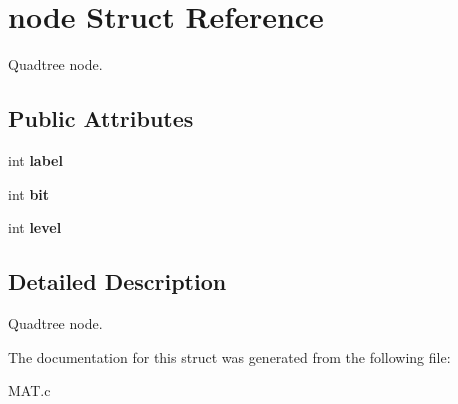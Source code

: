 \hypertarget{structnode}{}\section{node Struct Reference}
\label{structnode}


Quadtree node.  


\subsection*{Public Attributes}
\begin{DoxyCompactItemize}
\item 
\mbox{\label{structnode_a964cbb51357a791bf72d51d353e86be7}} 
int {\bfseries label}
\item 
\mbox{\label{structnode_a4e87cbc8748d74dab3bd9982f96bf11b}} 
int {\bfseries bit}
\item 
\mbox{\label{structnode_a3871d43e823ba9542b052912d01709dd}} 
int {\bfseries level}
\end{DoxyCompactItemize}


\subsection{Detailed Description}
Quadtree node. 

The documentation for this struct was generated from the following file\+:\begin{DoxyCompactItemize}
\item 
M\+A\+T.\+c\end{DoxyCompactItemize}
